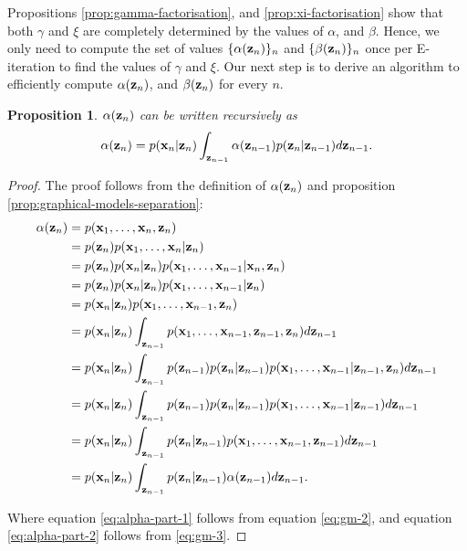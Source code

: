 \documentclass[11pt]{article}
\numberwithin{equation}{section}
\newcommand{\x}{{\bf x}}
\newcommand{\z}{{\bf z}}
\newtheorem{proposition}{Proposition}[section]
\begin{document}
Propositions \ref{prop:gamma-factorisation}, and \ref{prop:xi-factorisation} show that both $\gamma$ and $\xi$ are completely determined by the values of $\alpha$, and $\beta$. Hence, we only need to compute the set of values $\{\alpha(\z_n)\}_n$ and $\{\beta(\z_n)\}_n$ once per E-iteration to find the values of $\gamma$ and $\xi$. Our next step is to derive an algorithm to efficiently compute $\alpha(\z_n)$, and $\beta(\z_n)$ for every $n$.


\begin{proposition} \label{prop:alpha-recursive}
	$\alpha(\z_n)$ can be written recursively as
	\begin{equation}
		\alpha(\z_n) = p(\x_n\vert \z_n) \int_{\z_{n-1}} \alpha(\z_{n-1})p(\z_n\vert\z_{n-1}) d\z_{n-1}.
	\end{equation}
\end{proposition}

\begin{proof}
	The proof follows from the definition of $\alpha(\z_n)$ and proposition \ref{prop:graphical-models-separation}:
	\begin{align}
		\alpha(\z_n) &= p(\x_1, \ldots, \x_n, \z_n) \\
		&= p(\z_n) p(\x_1, \ldots, \x_n \vert \z_n) \\
		&= p(\z_n) p(\x_n \vert \z_n) p(\x_1, \ldots, \x_{n-1} \vert \x_n, \z_n) \\
		&= p(\z_n) p(\x_n \vert \z_n) p(\x_1, \ldots, \x_{n-1} \vert \z_n) \label{eq:alpha-part-1}\\
		&= p(\x_n \vert \z_n) p(\x_1, \ldots, \x_{n-1}, \z_n) \\
		&= p(\x_n \vert \z_n) \int_{\z_{n-1}}p(\x_1, \ldots, \x_{n-1}, \z_{n-1}, \z_n) d\z_{n-1}\\
		&= p(\x_n \vert \z_n) \int_{\z_{n-1}} p(\z_{n-1})p(\z_n \vert \z_{n-1})p(\x_1, \ldots, \x_{n-1} \vert \z_{n-1}, \z_n) d\z_{n-1}\\
		&= p(\x_n \vert \z_n) \int_{\z_{n-1}} p(\z_{n-1})p(\z_n \vert \z_{n-1})p(\x_1, \ldots, \x_{n-1} \vert \z_{n-1}) d\z_{n-1} \label{eq:alpha-part-2}\\ 
		&= p(\x_n \vert \z_n) \int_{\z_{n-1}} p(\z_n \vert \z_{n-1})p(\x_1, \ldots, \x_{n-1}, \z_{n-1}) d\z_{n-1}\\
		&= p(\x_n \vert \z_n) \int_{\z_{n-1}} p(\z_n \vert \z_{n-1})\alpha(\z_{n-1}) d\z_{n-1}.\\
	\end{align}
	
	Where equation \eqref{eq:alpha-part-1} follows from equation \eqref{eq:gm-2}, and equation \eqref{eq:alpha-part-2} follows from \eqref{eq:gm-3}.
\end{proof}
\end{document}
